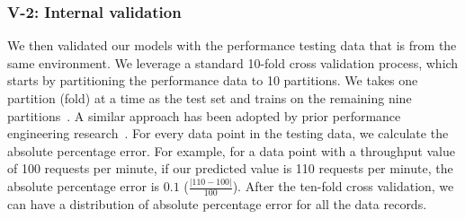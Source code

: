 
\subsubsection{V-2: Internal validation}

We then validated our models with the performance testing data that is from the same environment. We leverage a standard 10-fold cross validation process, which starts by partitioning the performance data to 10 partitions. We takes one partition (fold) at a time as the test set and trains on the remaining nine partitions~\cite{10foldcross,kohavi1995study}. A similar approach has been adopted by prior performance engineering research~\cite{haroon}. For every data point in the testing data, we calculate the absolute percentage error. For example, for a data point with a throughput value of 100 requests per minute, if our predicted value is 110 requests per minute, the absolute percentage error is $0.1$ ($\frac{|110-100|}{100}$). After the ten-fold cross validation, we can have a distribution of absolute percentage error for all the data records.



